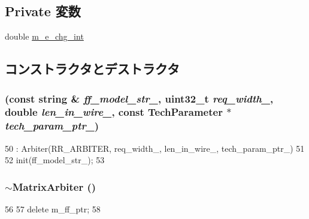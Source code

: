 \subsection*{Private 変数}
\begin{DoxyCompactItemize}
\item 
double \hyperlink{classMatrixArbiter_a185cba11681e698e1867fae8e8967e82}{m\_\-e\_\-chg\_\-int}
\end{DoxyCompactItemize}


\subsection{コンストラクタとデストラクタ}
\hypertarget{classMatrixArbiter_aca3381c7b32a94653b47781b359451f6}{
\subsubsection[{MatrixArbiter}]{ (const string \& {\em ff\_\-model\_\-str\_\-}, \/  {\bf uint32\_\-t} {\em req\_\-width\_\-}, \/  double {\em len\_\-in\_\-wire\_\-}, \/  const {\bf TechParameter} $\ast$ {\em tech\_\-param\_\-ptr\_\-})}}
\label{classMatrixArbiter_aca3381c7b32a94653b47781b359451f6}



\begin{DoxyCode}
50     : Arbiter(RR_ARBITER, req_width_, len_in_wire_, tech_param_ptr_)
51 {
52     init(ff_model_str_);
53 }
\end{DoxyCode}
\hypertarget{classMatrixArbiter_a9f8fd0c5e60bc21f35c982d9a022b38c}{
\subsubsection[{$\sim$MatrixArbiter}]{\setlength{\rightskip}{0pt plus 5cm}$\sim${\bf MatrixArbiter} ()}}
\label{classMatrixArbiter_a9f8fd0c5e60bc21f35c982d9a022b38c}



\begin{DoxyCode}
56 {
57     delete m_ff_ptr;
58 }
\end{DoxyCode}


